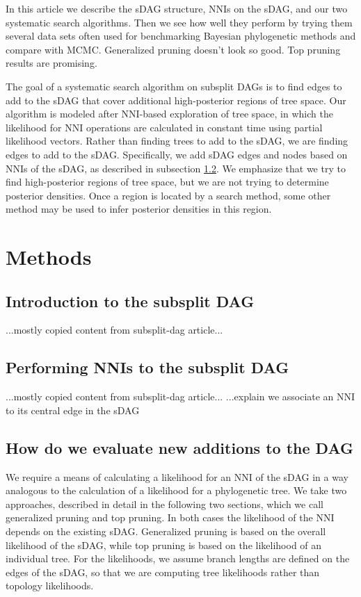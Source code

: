 \documentclass{article}
\begin{document}
In this article we describe the sDAG structure, NNIs on the sDAG, and our two systematic search algorithms.
Then we see how well they perform by trying them several data sets often used for benchmarking Bayesian phylogenetic methods and compare with MCMC. 
Generalized pruning doesn't look so good.
Top pruning results are promising.





The goal of a systematic search algorithm on subsplit DAGs is to find edges to add to the sDAG that cover additional high-posterior regions of tree space.
Our algorithm is modeled after NNI-based exploration of tree space, in which the likelihood for NNI operations are calculated in constant time using partial likelihood vectors.
Rather than finding trees to add to the sDAG, we are finding edges to add to the sDAG.
Specifically, we add sDAG edges and nodes based on NNIs of the sDAG, as described in subsection \ref{subsec:sdag_nni}.
We emphasize that we try to find high-posterior regions of tree space, but we are not trying to determine posterior densities.
Once a region is located by a search method, some other method may be used to infer posterior densities in this region.



\section{Methods}

\subsection{Introduction to the subsplit DAG}
...mostly copied content from subsplit-dag article...

\subsection{Performing NNIs to the subsplit DAG}\label{subsec:sdag_nni}
...mostly copied content from subsplit-dag article...
...explain we associate an NNI to its central edge in the sDAG



\subsection{How do we evaluate new additions to the DAG}\label{subsec:nni_edge_likelihood}

We require a means of calculating a likelihood for an NNI of the sDAG in a way analogous to the calculation of a likelihood for a phylogenetic tree. We take two approaches, described in detail in the following two sections, which we call generalized pruning and top pruning. In both cases the likelihood of the NNI depends on the existing sDAG. Generalized pruning is based on the overall likelihood of the sDAG, while top pruning is based on the likelihood of an individual tree. For the likelihoods, we assume branch lengths are defined on the edges of the sDAG, so that we are computing tree likelihoods rather than topology likelihoods.
\end{document}
